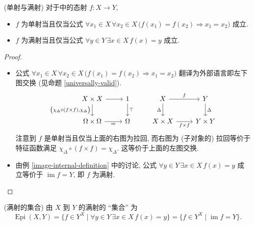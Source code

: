 \begin{example}
	{(单射与满射)}
	对于\topos{}中的态射 $f\colon X\to Y$,
	\begin{itemize}
		\item $f$ 为单射当且仅当公式 $\forall x_1\in X\,\forall x_2\in X\,\big(f(x_1)=f(x_2)\Rightarrow x_1=x_2\big)$ 成立.
		\item $f$ 为满射当且仅当公式 $\forall y\in Y\, \exists x\in X\, f(x)=y$ 成立.
	\end{itemize}
\end{example}
\begin{proof}~
	\begin{itemize}
		\item 公式 $\forall x_1\in X\,\forall x_2\in X\,\big(f(x_1)=f(x_2)\Rightarrow x_1=x_2\big)$ 翻译为外部语言即左下图交换 (见命题 \ref{universally-valid}).
		\[\begin{tikzcd}[ampersand replacement=\&]
			{X\times X} \& 1 \& X \& Y \\
			\Omega\times\Omega \& \Omega \& {X\times X} \& {Y\times Y}
			\arrow["{\big(\chi_\Delta\circ (f\times f),\chi_\Delta\big)}"', from=1-1, to=2-1]
			\arrow["\Rightarrow"', from=2-1, to=2-2]
			\arrow[from=1-1, to=1-2]
			\arrow["\top", from=1-2, to=2-2]
			\arrow["{f\times f}"', from=2-3, to=2-4]
			\arrow["\Delta"', from=1-3, to=2-3]
			\arrow["\Delta", from=1-4, to=2-4]
			\arrow["f", from=1-3, to=1-4]
		\end{tikzcd}\]
		注意到 $f$ 是单射当且仅当上面的右图为拉回, 而右图为 (子对象的) 拉回等价于特征函数满足 $\chi_\Delta\circ (f\times f) = \chi_\Delta$.
		这等价于上面的左图交换.
		\item 由例 \ref{image-internal-definition} 中的讨论, 公式 $\forall y\in Y\, \exists x\in X\, f(x)=y$ 成立等价于 $\operatorname{im}f=Y$, 即 $f$ 为满射.
	\end{itemize}
\end{proof}



\begin{example}
	[label={set-of-epimorphisms}]
	{(满射的集合)}
	由 $X$ 到 $Y$ 的满射的 ``集合'' 为
	\[
	\operatorname{Epi}(X,Y) = \{f\in Y^X \mid \forall y\in Y\, \exists x\in X\, f(x)=y\} = \{f\in Y^X\mid\operatorname{im}f=Y\}.
	\]
\end{example}


